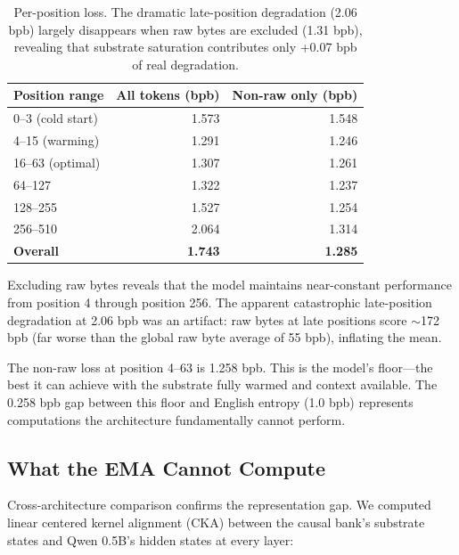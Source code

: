 \documentclass[11pt,a4paper]{report}
\begin{document}
\begin{table}[h]
\centering
\begin{tabular}{lrr}
\toprule
\textbf{Position range} & \textbf{All tokens (bpb)} & \textbf{Non-raw only (bpb)} \\
\midrule
0--3 (cold start) & 1.573 & 1.548 \\
4--15 (warming) & 1.291 & 1.246 \\
16--63 (optimal) & 1.307 & 1.261 \\
64--127 & 1.322 & 1.237 \\
128--255 & 1.527 & 1.254 \\
256--510 & 2.064 & 1.314 \\
\midrule
\textbf{Overall} & \textbf{1.743} & \textbf{1.285} \\
\bottomrule
\end{tabular}
\caption{Per-position loss. The dramatic late-position degradation (2.06 bpb) largely disappears when raw bytes are excluded (1.31 bpb), revealing that substrate saturation contributes only +0.07 bpb of real degradation.}
\label{tab:position_loss}
\end{table}

Excluding raw bytes reveals that the model maintains near-constant performance from position 4 through position 256. The apparent catastrophic late-position degradation at 2.06 bpb was an artifact: raw bytes at late positions score $\sim$172 bpb (far worse than the global raw byte average of 55 bpb), inflating the mean.

The non-raw loss at position 4--63 is 1.258 bpb. This is the model's floor---the best it can achieve with the substrate fully warmed and context available. The 0.258 bpb gap between this floor and English entropy (1.0 bpb) represents computations the architecture fundamentally cannot perform.

\subsection{What the EMA Cannot Compute}

Cross-architecture comparison confirms the representation gap. We computed linear centered kernel alignment (CKA) between the causal bank's substrate states and Qwen 0.5B's hidden states at every layer:
\end{document}
